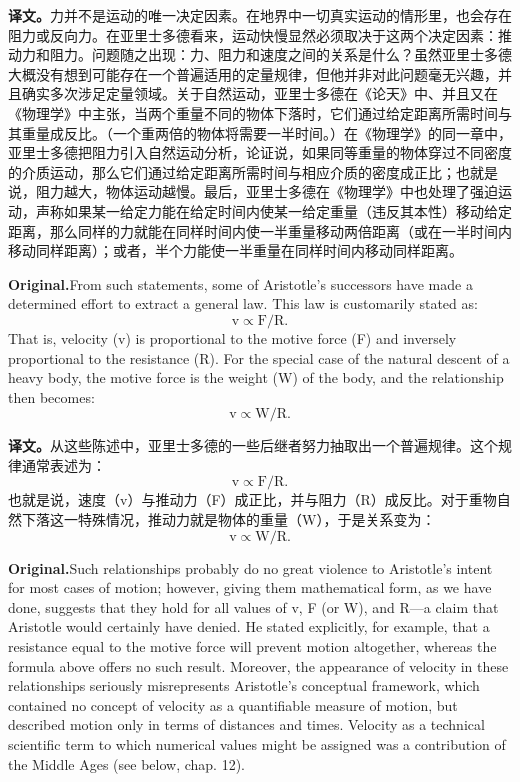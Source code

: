 \documentclass[UTF8]{ctexart}
\newcommand{\orig}{\par\noindent\textbf{Original.}\quad}
\newcommand{\zh}{\par\noindent\textbf{译文。}\quad}
\begin{document}
\zh 力并不是运动的唯一决定因素。在地界中一切真实运动的情形里，也会存在阻力或反向力。在亚里士多德看来，运动快慢显然必须取决于这两个决定因素：推动力和阻力。问题随之出现：力、阻力和速度之间的关系是什么？虽然亚里士多德大概没有想到可能存在一个普遍适用的定量规律，但他并非对此问题毫无兴趣，并且确实多次涉足定量领域。关于自然运动，亚里士多德在《论天》中、并且又在《物理学》中主张，当两个重量不同的物体下落时，它们通过给定距离所需时间与其重量成反比。（一个重两倍的物体将需要一半时间。）在《物理学》的同一章中，亚里士多德把阻力引入自然运动分析，论证说，如果同等重量的物体穿过不同密度的介质运动，那么它们通过给定距离所需时间与相应介质的密度成正比；也就是说，阻力越大，物体运动越慢。最后，亚里士多德在《物理学》中也处理了强迫运动，声称如果某一给定力能在给定时间内使某一给定重量（违反其本性）移动给定距离，那么同样的力就能在同样时间内使一半重量移动两倍距离（或在一半时间内移动同样距离）；或者，半个力能使一半重量在同样时间内移动同样距离。

\orig From such statements, some of Aristotle's successors have made a determined effort to extract a general law. This law is customarily stated as:
\[
\mathrm{v} \propto \mathrm{F}/\mathrm{R}.
\]
That is, velocity (v) is proportional to the motive force (F) and inversely proportional to the resistance (R). For the special case of the natural descent of a heavy body, the motive force is the weight (W) of the body, and the relationship then becomes:
\[
\mathrm{v} \propto \mathrm{W}/\mathrm{R}.
\]

\zh 从这些陈述中，亚里士多德的一些后继者努力抽取出一个普遍规律。这个规律通常表述为：
\[
\mathrm{v} \propto \mathrm{F}/\mathrm{R}.
\]
也就是说，速度（v）与推动力（F）成正比，并与阻力（R）成反比。对于重物自然下落这一特殊情况，推动力就是物体的重量（W），于是关系变为：
\[
\mathrm{v} \propto \mathrm{W}/\mathrm{R}.
\]

\orig Such relationships probably do no great violence to Aristotle's intent for most cases of motion; however, giving them mathematical form, as we have done, suggests that they hold for all values of v, F (or W), and R---a claim that Aristotle would certainly have denied. He stated explicitly, for example, that a resistance equal to the motive force will prevent motion altogether, whereas the formula above offers no such result. Moreover, the appearance of velocity in these relationships seriously misrepresents Aristotle's conceptual framework, which contained no concept of velocity as a quantifiable measure of motion, but described motion only in terms of distances and times. Velocity as a technical scientific term to which numerical values might be assigned was a contribution of the Middle Ages (see below, chap. 12).
\end{document}
